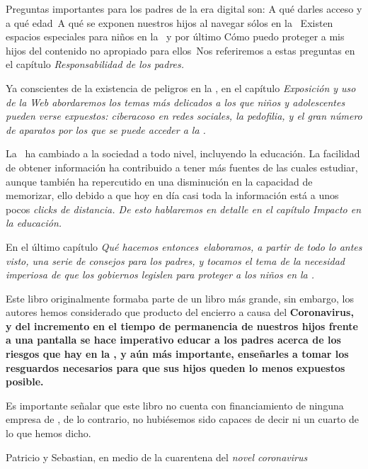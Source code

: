 Preguntas importantes para los padres de la era digital
son: \oqm A qu\'e darles acceso y a qu\'e edad\cqm\ 
\oqm A qu\'e se exponen nuestros hijos al navegar s\'olos en la \internet \cqm\
\oqm Existen espacios especiales para ni\~nos en la \web \cqm\
y por \'ultimo \oqm C\'omo puedo proteger a mis hijos del contenido no apropiado para ellos\cqm\
Nos referiremos a estas preguntas en el cap\'itulo \it{Responsabilidad de los padres}. 

Ya conscientes de la existencia de peligros en la \internet, en el cap\'itulo
\it{Exposici\'on y uso de la Web} abordaremos los temas m\'as delicados
a los que ni\~nos y adolescentes pueden verse expuestos: 
ciberacoso en redes sociales, la pedofilia, y el gran n\'umero de 
aparatos por los que se puede acceder a la \web.

La \internet\ ha cambiado a la sociedad a todo nivel, 
incluyendo la educaci\'on. 
La facilidad de obtener informaci\'on 
ha contribuido a tener m\'as fuentes de las cuales estudiar,
aunque tambi\'en ha repercutido en una disminuci\'on
en la capacidad de memorizar, ello debido a que hoy
en d\'ia casi toda la informaci\'on est\'a a unos pocos \it{clicks} de distancia.
De esto hablaremos en detalle en el cap\'itulo \it{Impacto en la educaci\'on}.

En el \'ultimo cap\'itulo \it{\oqm Qu\'e hacemos entonces\cqm}\
elaboramos, a partir de todo lo antes visto, 
una serie de consejos para los padres, 
y tocamos el tema de la necesidad imperiosa de que los gobiernos legislen
para proteger a los ni\~nos en la \web.


Este libro originalmente formaba parte de un libro m\'as grande,
sin embargo, los autores hemos considerado que 
producto del encierro a causa del \bf{Coronavirus}, 
y del incremento en el tiempo de permanencia de 
nuestros hijos frente a una pantalla se hace imperativo 
educar a los padres acerca de los riesgos que hay en la \web,
y a\'un m\'as importante, ense\~narles a tomar los resguardos
necesarios para que sus hijos queden lo menos expuestos posible.

Es importante se\~nalar que este libro no cuenta con financiamiento
de ninguna empresa de \internet, 
de lo contrario, no hubi\'esemos sido capaces de decir ni un cuarto de 
lo que hemos dicho.

Patricio y Sebastian, en medio de la cuarentena del \it{novel coronavirus}


\fi
